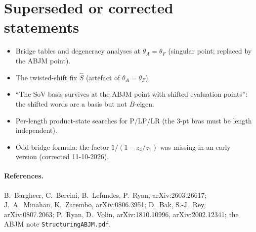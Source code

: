 \documentclass[11pt]{article}
\newcommand{\nb}[1]{\texttt{#1}}
\begin{document}
\section{Superseded or corrected statements}
\begin{itemize}
\item Bridge tables and degeneracy analyses at $\theta_A=\theta_F$ (singular point; replaced by the ABJM point).
\item The twisted-shift fix $\hat S$ (artefact of $\theta_A=\theta_F$).
\item ``The SoV basis survives at the ABJM point with shifted evaluation points'': the shifted words are a basis but not
$B$-eigen.
\item Per-length product-state searches for P/LP/LR (the 3-pt bras must be length independent).
\item Odd-bridge formula: the factor $1/(1-z_4/z_1)$ was missing in an early version (corrected 11-10-2026).
\end{itemize}

\paragraph{References.} B.~Bargheer, C.~Bercini, B.~Lefundes, P.~Ryan, arXiv:2603.26617;
J.~A.~Minahan, K.~Zarembo, arXiv:0806.3951; D.~Bak, S.-J.~Rey, arXiv:0807.2063;
P.~Ryan, D.~Volin, arXiv:1810.10996, arXiv:2002.12341; the ABJM note \nb{StructuringABJM.pdf}.
\end{document}
